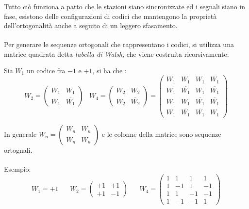 \documentclass[12pt, letterpaper]{article}
\newcommand{\acc}{\\\hphantom{}\\}
\begin{document}
Tutto ciò funziona a patto che le stazioni siano sincronizzate ed i segnali siano in fase, esistono delle 
configurazioni di codici che mantengono la proprietà dell'ortogonalità anche a seguito di un leggero sfasamento.\acc 
Per generare le sequenze ortogonali che rappresentano i codici, si utilizza una matrice quadrata detta 
\textit{tabella di Walsh}, che viene costruita ricorsivamente:\begin{center}
    Sia $W_1$ un codice fra $-1$ e $+1$, si ha che : 
    $$ W_2=\begin{pmatrix}
        W_1&W_1\\ W_1&\overline{W_1}
    \end{pmatrix}\;\;\; W_4=\begin{pmatrix}
        W_2&W_2\\ W_2&\overline{W_2}\end{pmatrix}=\begin{pmatrix}
            W_1& W_1& W_1& W_1\\ 
            W_1&\overline{ W_1}& W_1&\overline{ W_1}\\ 
            W_1& W_1&\overline{W_1}&\overline{W_1}\\
            W_1&\overline{ W_1} &\overline{ W_1}&W_1
        \end{pmatrix}
    $$
\end{center}
    In generale $W_n = \begin{pmatrix}
        W_n&W_n\\ W_n&\overline{W_n}
    \end{pmatrix}$ e le colonne della matrice sono sequenze ortognali.\acc  Esempio:
    $$ W_1 = +1 \;\;\;\;\;\;W_2=\begin{pmatrix}
        +1&+1\\ +1&-1
    \end{pmatrix}\;\;\;\;\;\;W_4=
    \begin{pmatrix}
        1& 1& 1& 1\\ 
        1&-1& 1&-1\\ 
        1& 1&-1&-1\\
        1&-1 &-1&1
    \end{pmatrix}$$
\end{document}
